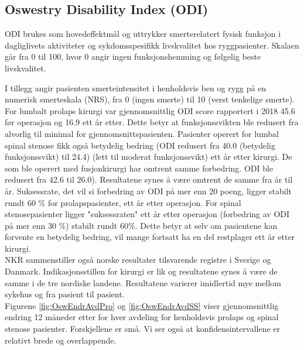 \documentclass [norsk,a4paper,twoside]{article}\usepackage[]{graphicx}\usepackage[]{color}
\begin{document}
\subsection{Oswestry Disability Index (ODI)}


      
      
      
      ODI brukes som hovedeffektmål og uttrykker smerterelatert  fysisk funksjon i dagliglivets aktiviteter og sykdomsspesifikk livskvalitet hos ryggpasienter. Skalaen går fra 0
til 100, hvor 0 angir ingen funksjonshemming og følgelig beste livskvalitet.

I tillegg angir pasienten smerteintensitet i henholdsvis ben og rygg på en numerisk smerteskala (NRS), 
fra 0 (ingen smerte) til 10 (verst tenkelige smerte).
\\

For lumbalt prolaps kirurgi var gjennomsnittlig ODI score rapportert i 2018 45.6 før operasjon og 16.9 ett år etter. Dette betyr at funksjonssvikten ble redusert 
fra alvorlig til minimal for gjennomsnittspasienten. 
Pasienter operert for lumbal spinal stenose fikk også
betydelig bedring (ODI redusert fra 40.0 (betydelig funksjonssvikt) til 24.4) (lett til moderat funksjonssvikt) ett år etter kirurgi. 
De som ble operert med fusjonkirurgi har
omtrent samme forbedring. ODI ble redusert fra 42.6 til 26.0). Resultatene synes å være omtrent de samme fra år til år. Suksessrate, det vil si forbedring av ODI på mer enn 20 poeng, ligger stabilt rundt 60 \% for prolapspasienter, ett år etter operasjon. 
For spinal stenosepasienter ligger "suksessraten"  ett år etter operasjon (forbedring av ODI på mer enn 30 \%) stabilt rundt 60\%.
Dette betyr at selv om
pasientene kan forvente en betydelig bedring, vil mange fortsatt ha en del restplager
ett år etter kirurgi. \\
 
 NKR
sammenstiller også norske resultater tilsvarende registre i Sverige og
Danmark. Indikasjonsstillen for kirurgi er lik og resultatene synes å være de samme i de tre nordiske landene.
Resultatene varierer imidlertid mye mellom sykehus og fra pasient til pasient. \\






      
      Figurene \ref{fig:OswEndrAvdPro} og \ref{fig:OswEndrAvdSS} viser gjennomsnittlig endring 12 måneder etter for hver avdeling for henholdsvis prolaps og spinal stenose pasienter. Forskjellene er små. Vi ser også at konfidensintervallene er relativt brede og overlappende.
\end{document}
